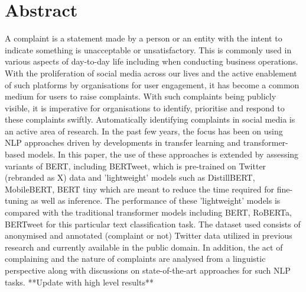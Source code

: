 \chapter*{\Large \center Abstract}

A complaint is a statement made by a person or an entity with the intent to indicate something is unacceptable or unsatisfactory. This is commonly used in various aspects of day-to-day life including when conducting business operations. With the proliferation of social media across our lives and the active enablement of such platforms by organisations for user engagement, it has become a common medium for users to raise complaints. With such complaints being publicly visible, it is imperative for organisations to identify, prioritise and respond to these complaints swiftly. Automatically identifying complaints in social media is an active area of research. In the past few years, the focus has been on using NLP approaches driven by developments in transfer learning and transformer-based models.
\newline \newline
In this paper, the use of these approaches is extended by assessing variants of BERT, including BERTweet, which is pre-trained on Twitter (rebranded as X) data and 'lightweight' models such as DistillBERT, MobileBERT, BERT tiny which are meant to reduce the time required for fine-tuning as well as inference. The performance of these 'lightweight' models is compared with the traditional transformer models including BERT, RoBERTa, BERTweet for this particular text classification task. The dataset used consists of anonymised and annotated (complaint or not) Twitter data utilized in previous research and currently available in the public domain. In addition, the act of complaining and the nature of complaints are analysed from a linguistic perspective along with discussions on state-of-the-art approaches for such NLP tasks.
\newline \newline
**Update with high level results**